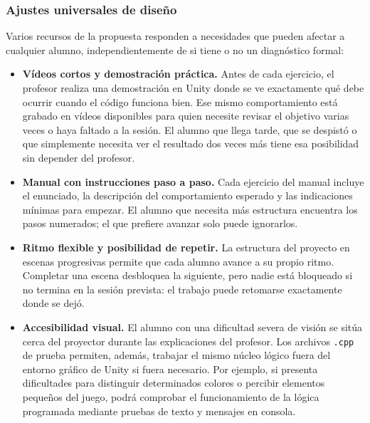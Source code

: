 \documentclass[a4paper,12pt]{article}
\begin{document}
\subsubsection*{Ajustes universales de diseño}


Varios recursos de la propuesta responden a necesidades que pueden afectar a cualquier alumno, independientemente de si tiene o no un diagnóstico formal:


\begin{itemize}
  \item \textbf{Vídeos cortos y demostración práctica.} Antes de cada ejercicio, el profesor realiza una demostración en Unity donde se ve exactamente qué debe ocurrir cuando el código funciona bien. Ese mismo comportamiento está grabado en vídeos disponibles para quien necesite revisar el objetivo varias veces o haya faltado a la sesión. El alumno que llega tarde, que se despistó o que simplemente necesita ver el resultado dos veces más tiene esa posibilidad sin depender del profesor.
  \item \textbf{Manual con instrucciones paso a paso.} Cada ejercicio del manual incluye el enunciado, la descripción del comportamiento esperado y las indicaciones mínimas para empezar. El alumno que necesita más estructura encuentra los pasos numerados; el que prefiere avanzar solo puede ignorarlos.
  \item \textbf{Ritmo flexible y posibilidad de repetir.} La estructura del proyecto en escenas progresivas permite que cada alumno avance a su propio ritmo. Completar una escena desbloquea la siguiente, pero nadie está bloqueado si no termina en la sesión prevista: el trabajo puede retomarse exactamente donde se dejó.
  \item \textbf{Accesibilidad visual.} El alumno con una dificultad severa de visión se sitúa cerca del proyector durante las explicaciones del profesor. Los archivos \texttt{.cpp} de prueba permiten, además, trabajar el mismo núcleo lógico fuera del entorno gráfico de Unity si fuera necesario. Por ejemplo, si presenta dificultades para distinguir determinados colores o percibir elementos pequeños del juego, podrá comprobar el funcionamiento de la lógica programada mediante pruebas de texto y mensajes en consola.
\end{itemize}
\end{document}
